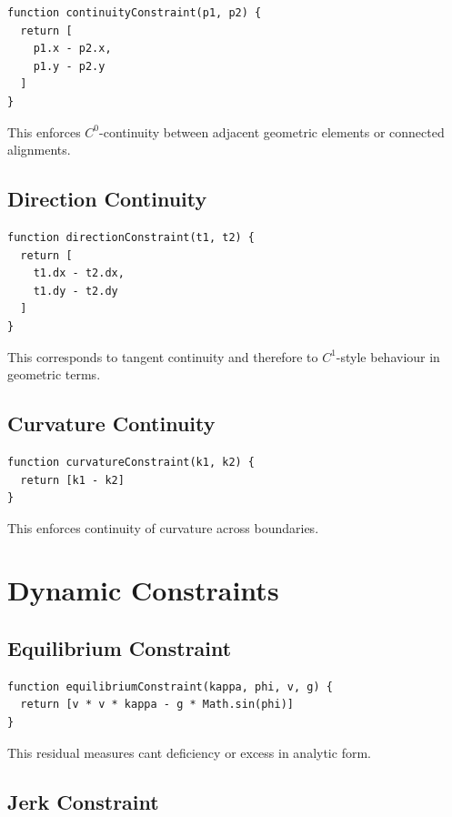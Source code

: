 \begin{verbatim}
function continuityConstraint(p1, p2) {
  return [
    p1.x - p2.x,
    p1.y - p2.y
  ]
}
\end{verbatim}

This enforces \(C^0\)-continuity between adjacent geometric elements or
connected alignments.

\subsection{Direction Continuity}

\begin{verbatim}
function directionConstraint(t1, t2) {
  return [
    t1.dx - t2.dx,
    t1.dy - t2.dy
  ]
}
\end{verbatim}

This corresponds to tangent continuity and therefore to \(C^1\)-style
behaviour in geometric terms.

\subsection{Curvature Continuity}

\begin{verbatim}
function curvatureConstraint(k1, k2) {
  return [k1 - k2]
}
\end{verbatim}

This enforces continuity of curvature across boundaries.

\section{Dynamic Constraints}

\subsection{Equilibrium Constraint}

\begin{verbatim}
function equilibriumConstraint(kappa, phi, v, g) {
  return [v * v * kappa - g * Math.sin(phi)]
}
\end{verbatim}

This residual measures cant deficiency or excess in analytic form.

\subsection{Jerk Constraint}

